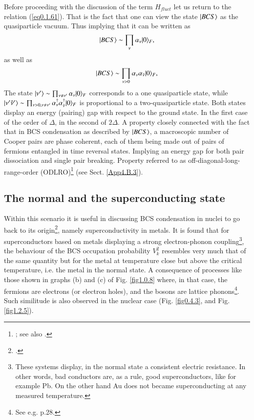 Before proceeding with the discussion of the term $H_{fluct}$ let us return to the relation (\ref{eq0.1.61}). That is the fact that one can view the state $|{BCS} \rangle$ as the quasiparticle vacuum. Thus implying  that it can be written as
\begin{align}\label{eq1.4.57}
|{BCS} \rangle\sim\prod_{\nu}\alpha_\nu|{0} \rangle_F,
\end{align}
as well as
\begin{align}\label{eq1.4.58}
|{BCS} \rangle\sim\prod_{\nu>0}\alpha_\nu\alpha_{\tilde\nu}|{0} \rangle_F,
\end{align}
The state $|{\nu'} \rangle\sim\prod_{\nu\neq\nu'}\alpha_\nu|{0} \rangle_F$ corresponds to a one quasiparticle state, while $|{\nu'\tilde\nu'} \rangle\sim\prod_{\nu>0,\nu\neq\nu'}\alpha_\nu^\dagger\alpha_{\tilde\nu}^\dagger|{0} \rangle_F$ is proportional to a two-quasiparticle state. Both states display an energy (pairing) gap with respect to the ground state. In the first case of the order of $\Delta$, in the second of $2\Delta$. A property closely connected with the fact that in BCS condensation as described by $|{BCS} \rangle$, a macroscopic number of Cooper pairs are phase coherent, each of them  being made out of pairs of fermions entangled in time reversal states. Implying an energy gap for both pair dissociation and single pair breaking. Property referred to as off-diagonal-long-range-order (ODLRO)\footnote{\label{f37c1} \cite{Penrose:51,Penrose:56,Yang:62}; see also \cite{Anderson:96}.} (see Sect. \ref{App4.B.3}).

\subsection{The normal and the superconducting state}
 Within this scenario it is useful in discussing BCS condensation in nuclei to go back to its origin\footnote{\cite{Bohr:58}.}, namely superconductivity in metals. It is found that for superconductors based on metals displaying a strong electron-phonon coupling\footnote{These systems display, in the normal state a consistent electric resistance. In other words, bad conductors are, as a rule, good superconductors, like for example Pb. On the other hand Au does not became superconducting at any measured temperature.}, the behaviour of the BCS occupation probability $V^2_k$ resembles very much that of the same quantity but for the metal at temperature close but above the critical temperature, i.e. the metal in the normal state. A consequence of processes like those shown in graphs (b) and (c) of Fig. \ref{fig1.0.8} where, in that case, the fermions are electrons (or electron holes), and the bosons are lattice phonons\footnote{See e.g. \cite{Tinkham:96} p.28.}. Such similitude is also observed in the nuclear case (Fig. \ref{fig0.4.3}, and Fig. \ref{fig1.2.5}). 
 
